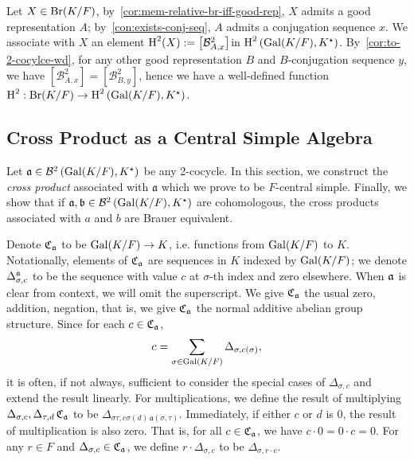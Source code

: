 \begin{construction}\label{con:br-to-snd-coh}
  Let $X \in \operatorname{Br}(K/F)$, by~\cref{cor:mem-relative-br-iff-good-rep}, $X$ admits a good representation $A$; by~\cref{con:exists-conj-seq}, $A$ admits a conjugation sequence $x$. We associate with $X$ an element $\operatorname{H}^{2}(X) := \left[\mathcal{B}^{2}_{A,x}\right]$in $\operatorname{H}^{2}\left(\operatorname{Gal}(K/F),K^{\star}\right)$. By~\cref{cor:to-2-cocylce-wd}, for any other good representation $B$ and $B$-conjugation sequence $y$, we have $\left[\mathcal{B}^{2}_{A,x}\right]=\left[\mathcal{B}^{2}_{B,y}\right]$, hence we have a well-defined function $\operatorname{H}^{2} : \operatorname{Br}(K/F) \to \operatorname{H}^{2}\left(\operatorname{Gal}(K/F),K^{\star}\right)$.
  \leanok
\end{construction}

\subsection{Cross Product as a Central Simple Algebra}

Let $\mathfrak{a} \in \mathcal{B}^{2}\left(\operatorname{Gal}(K/F), K^{\star}\right)$ be any 2-cocycle. In this section, we construct the {\em cross product\/} associated with $\mathfrak{a}$ which we prove to be $F$-central simple. Finally, we show that if $\mathfrak{a}, \mathfrak{b}\in\mathcal{B}^{2}\left(\operatorname{Gal}(K/F), K^{\star}\right)$ are cohomologous, the cross products associated with $a$ and $b$ are Brauer equivalent.

\begin{construction}\label{con:cross-product}
  Denote $\operatorname{\mathfrak{C}}_{\mathfrak{a}}$ to be $\operatorname{Gal}(K/F) \to K$, i.e. functions from $\operatorname{Gal}(K/F)$ to $K$. Notationally, elements of $\operatorname{\mathfrak{C}}_{\mathfrak{a}}$ are sequences in $K$ indexed by $\operatorname{Gal}(K/F)$; we denote $\Delta^{\mathfrak{a}}_{\sigma, c}$ to be the sequence with value $c$ at $\sigma$-th index and zero elsewhere. When $\mathfrak{a}$ is clear from context, we will omit the superscript. We give $\operatorname{\mathfrak{C}}_{\mathfrak{a}}$ the usual zero, addition, negation, that is, we give $\operatorname{\mathfrak{C}}_{\mathfrak{a}}$ the normal additive abelian group structure. Since for each $c \in \operatorname{\mathfrak{C}}_{\mathfrak{a}}$,
  \[
    c = \sum_{\sigma\in\operatorname{Gal}(K/F)}\Delta_{\sigma, c(\sigma)},
    \]
    it is often, if not always, sufficient to consider the special cases of $\Delta_{\sigma, c}$ and extend the result linearly.
  For multiplications, we define the result of multiplying $\Delta_{\sigma, c},\Delta_{\tau, d} \operatorname{\mathfrak{C}}_{\mathfrak{a}}$ to be $\Delta_{\sigma\tau, c\sigma(d)\, \mathfrak{a}(\sigma,\tau)}$. Immediately, if either $c$ or $d$ is $0$, the result of multiplication is also zero. That is, for all $c \in \operatorname{\mathfrak{C}}_{\mathfrak{a}}$, we have $c\cdot 0=0\cdot c =0$. For any $r \in F$ and $\Delta_{\sigma, c} \in \operatorname{\mathfrak{C}}_{\mathfrak{a}}$, we define $r \cdot \Delta_{\sigma, c}$ to be $\Delta_{\sigma, r\cdot c}$.
  \leanok
\end{construction}

